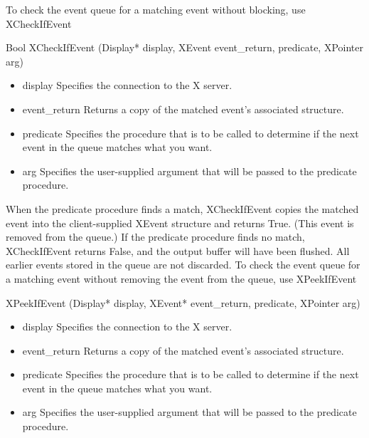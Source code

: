 \documentclass{report}
\begin{document}
\begin{itemize}
            \bigbreak \noindent 
            To check the event queue for a matching event without blocking, use XCheckIfEvent
            \bigbreak \noindent 
            \begin{cppcode}
            Bool XCheckIfEvent (Display* display, XEvent event_return, predicate, XPointer arg)
            \end{cppcode}
            \bigbreak \noindent
            \begin{itemize}
                \item display Specifies the connection to the X server.
                \item event\_return Returns a copy of the matched event’s associated structure.
                \item predicate Specifies the procedure that is to be called to determine if the next event in the queue matches what you want.
                \item arg Specifies the user-supplied argument that will be passed to the predicate procedure.
            \end{itemize}
            When the predicate procedure finds a match, XCheckIfEvent copies the matched event into the client-supplied XEvent structure and returns True. (This event is removed from the queue.) If the predicate procedure finds no match, XCheckIfEvent returns False, and the output buffer will have been flushed. All earlier events stored in the queue are not discarded.
            \bigbreak \noindent 
            To check the event queue for a matching event without removing the event from the queue, use XPeekIfEvent
            \bigbreak \noindent 
            \begin{cppcode}
            XPeekIfEvent (Display* display, XEvent* event_return, predicate, XPointer arg)
            \end{cppcode}
            \bigbreak \noindent
            \begin{itemize}
                \item display Specifies the connection to the X server.
                \item event\_return Returns a copy of the matched event’s associated structure.
                \item predicate Specifies the procedure that is to be called to determine if the next event in the queue matches what you want.
                \item arg Specifies the user-supplied argument that will be passed to the predicate procedure.

\end{itemize}
\end{itemize}
\end{document}
